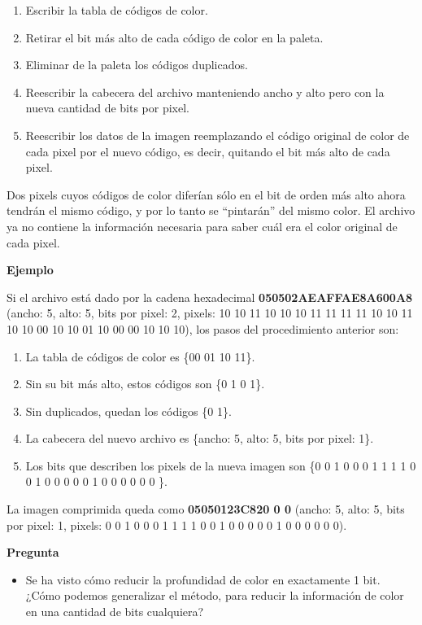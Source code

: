 \documentclass[spanish,A4,]{article}
\begin{document}
\begin{enumerate}
\def\labelenumi{\arabic{enumi}.}
\itemsep1pt\parskip0pt
\item
  Escribir la tabla de códigos de color.
\item
  Retirar el bit más alto de cada código de color en la paleta.
\item
  Eliminar de la paleta los códigos duplicados.
\item
  Reescribir la cabecera del archivo manteniendo ancho y alto pero con
  la nueva cantidad de bits por pixel.
\item
  Reescribir los datos de la imagen reemplazando el código original de
  color de cada pixel por el nuevo código, es decir, quitando el bit más
  alto de cada pixel.
\end{enumerate}

Dos pixels cuyos códigos de color diferían sólo en el bit de orden más
alto ahora tendrán el mismo código, y por lo tanto se ``pintarán'' del
mismo color. El archivo ya no contiene la información necesaria para
saber cuál era el color original de cada pixel.

\textbf{Ejemplo}

Si el archivo está dado por la cadena hexadecimal
\textbf{050502AEAFFAE8A600A8} (ancho: 5, alto: 5, bits por pixel: 2,
pixels: 10 10 11 10 10 10 11 11 11 11 10 10 11 10 10 00 10 10 01 10 00
00 10 10 10), los pasos del procedimiento anterior son:

\begin{enumerate}
\def\labelenumi{\arabic{enumi}.}
\itemsep1pt\parskip0pt
\item
  La tabla de códigos de color es \{00 01 10 11\}.
\item
  Sin su bit más alto, estos códigos son \{0 1 0 1\}.
\item
  Sin duplicados, quedan los códigos \{0 1\}.
\item
  La cabecera del nuevo archivo es \{ancho: 5, alto: 5, bits por pixel:
  1\}.
\item
  Los bits que describen los pixels de la nueva imagen son \{0 0 1 0 0 0
  1 1 1 1 0 0 1 0 0 0 0 0 1 0 0 0 0 0 0 \}.
\end{enumerate}

La imagen comprimida queda como \textbf{05050123C820 0 0} (ancho: 5, alto:
5, bits por pixel: 1, pixels: 0 0 1 0 0 0 1 1 1 1 0 0 1 0 0 0 0 0 1 0 0
0 0 0 0).

\textbf{Pregunta}

\begin{itemize}
\itemsep1pt\parskip0pt
\item
  Se ha visto cómo reducir la profundidad de color en exactamente 1 bit.
  ¿Cómo podemos generalizar el método, para reducir la información de
  color en una cantidad de bits cualquiera?
\end{itemize}
\end{document}
